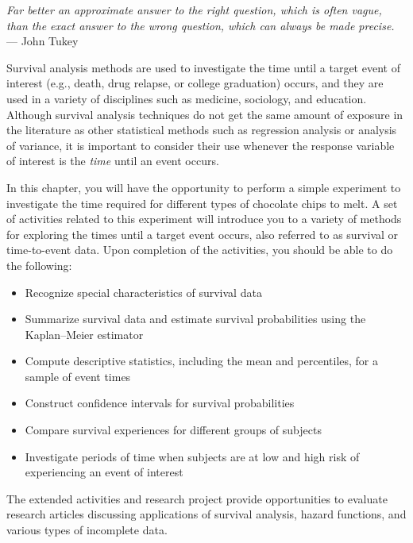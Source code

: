 \documentclass[
]{report}
\providecommand{\tightlist}{%
  \setlength{\itemsep}{0pt}\setlength{\parskip}{0pt}}
\begin{document}
\emph{Far better an approximate answer to the right question, which is often vague, than the exact answer to the wrong question, which can always be made precise.}\\
--- John Tukey

Survival analysis methods are used to investigate the time until a target event of interest (e.g., death, drug relapse, or college graduation) occurs, and they are used in a variety of disciplines such as medicine, sociology, and education. Although survival analysis techniques do not get the same amount of exposure in the literature as other statistical methods such as regression analysis or analysis of variance, it is important to consider their use whenever the response variable of interest is the \emph{time} until an event occurs.

In this chapter, you will have the opportunity to perform a simple experiment to investigate the time required for different types of chocolate chips to melt. A set of activities related to this experiment will introduce you to a variety of methods for exploring the times until a target event occurs, also referred to as survival or time-to-event data. Upon completion of the activities, you should be able to do the following:

\begin{itemize}
\tightlist
\item
  Recognize special characteristics of survival data\\
\item
  Summarize survival data and estimate survival probabilities using the Kaplan--Meier estimator\\
\item
  Compute descriptive statistics, including the mean and percentiles, for a sample of event times\\
\item
  Construct confidence intervals for survival probabilities\\
\item
  Compare survival experiences for different groups of subjects\\
\item
  Investigate periods of time when subjects are at low and high risk of experiencing an event of interest
\end{itemize}

The extended activities and research project provide opportunities to evaluate research articles discussing applications of survival analysis, hazard functions, and various types of incomplete data.
\end{document}
